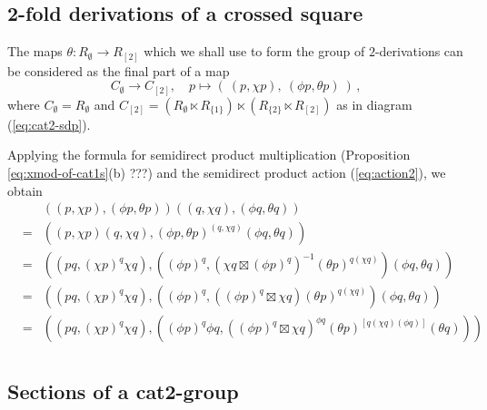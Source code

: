 \vspace*{15mm}
\subsection{2-fold derivations of a crossed square} \label{subs:xsq-der}

The maps $\theta : R_{\emptyset} \to R_{[2]}$ which we shall use to form
the group of $2$-derivations can be considered as the final part of a map
$$
C_{\emptyset} \to C_{[2]},\quad
p \mapsto (~(p, \chi p),~(\phi p, \theta p)~)\,,
$$
where $C_{\emptyset} = R_{\emptyset}$ and $C_{[2]} = 
(R_{\emptyset} \ltimes R_{\{1\}}) \ltimes (R_{\{2\}} \ltimes R_{[2]})$
as in diagram (\ref{eq:cat2-sdp}).

Applying the formula for semidirect product multiplication 
(Proposition \ref{eq:xmod-of-cat1s}(b) ???) 
and the semidirect product action (\ref{eq:action2}), we obtain
\begin{eqnarray*}
  &   & ((p, \chi p),(\phi p, \theta p))((q, \chi q),(\phi q, \theta q)) \\
  & = & ((p, \chi p)(q, \chi q),
         (\phi p, \theta p)^{(q, \chi q)}(\phi q,\theta q)) \\
  & = & ((pq, (\chi p)^q \chi q),
         ((\phi p)^q, (\chi q \boxtimes (\phi p)^q)^{-1} 
                      (\theta p)^{q (\chi q)}) (\phi q, \theta q)) \\
  & = & ((pq, (\chi p)^q \chi q),
         ((\phi p)^q, ((\phi p)^q \boxtimes \chi q) 
                      (\theta p)^{q (\chi q)}) (\phi q, \theta q)) \\
  & = & ((pq, (\chi p)^q \chi q),
         ((\phi p)^q \phi q, ((\phi p)^q \boxtimes \chi q)^{\phi q} 
                      (\theta p)^{[q (\chi q)(\phi q)]} (\theta q))) \\
\end{eqnarray*}



\subsection{Sections of a cat2-group}

